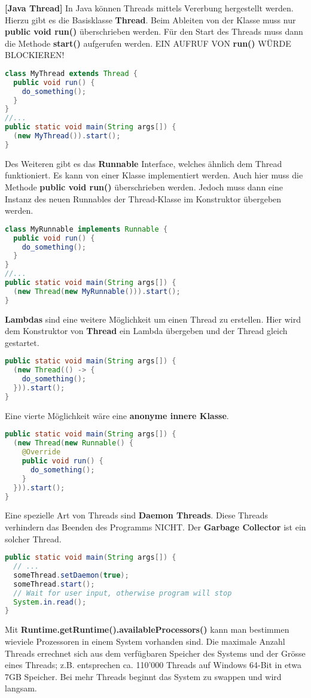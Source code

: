 \documentclass[8pt]{extarticle}
\let\oldtextbf\textbf
\renewcommand{\textbf}{\tiny\oldtextbf}
\begin{document}
\begin{multicols*}{5}
\textbf{[Java Thread]}
In Java können Threads mittels Vererbung hergestellt werden. Hierzu gibt es die Basisklasse \textbf{Thread}. Beim Ableiten von der Klasse muss nur \textbf{public void run()} überschrieben werden. Für den Start des Threads muss dann die Methode \textbf{start()} aufgerufen werden. EIN AUFRUF VON \textbf{run()} WÜRDE BLOCKIEREN!
\begin{lstlisting}[language=java]
class MyThread extends Thread {
  public void run() {
    do_something();
  }
}
//...
public static void main(String args[]) {
  (new MyThread()).start();
}
\end{lstlisting}
Des Weiteren gibt es das \textbf{Runnable} Interface, welches ähnlich dem Thread funktioniert. Es kann von einer Klasse implementiert werden. Auch hier muss die Methode \textbf{public void run()} überschrieben werden. Jedoch muss dann eine Instanz des neuen Runnables der Thread-Klasse im Konstruktor übergeben werden.
\begin{lstlisting}[language=java]
class MyRunnable implements Runnable {
  public void run() {
    do_something();
  }
}
//...
public static void main(String args[]) {
  (new Thread(new MyRunnable())).start();
}
\end{lstlisting}
\textbf{Lambdas} sind eine weitere Möglichkeit um einen Thread zu erstellen. Hier wird dem Konstruktor von \textbf{Thread} ein Lambda übergeben und der Thread gleich gestartet.
\begin{lstlisting}[language=java]
public static void main(String args[]) {
  (new Thread(() -> {
    do_something();
  })).start();
}
\end{lstlisting}
Eine vierte Möglichkeit wäre eine \textbf{anonyme innere Klasse}.
\begin{lstlisting}[language=java]
public static void main(String args[]) {
  (new Thread(new Runnable() {
    @Override
    public void run() {
      do_something();
    }
  })).start();
}
\end{lstlisting}
Eine spezielle Art von Threads sind \textbf{Daemon Threads}. Diese Threads verhindern das Beenden des Programms NICHT. Der \textbf{Garbage Collector} ist ein solcher Thread.
\begin{lstlisting}[language=java]
public static void main(String args[]) {
  // ...
  someThread.setDaemon(true);
  someThread.start();
  // Wait for user input, otherwise program will stop
  System.in.read();
}
\end{lstlisting}
Mit \textbf{Runtime.getRuntime().availableProcessors()} kann man bestimmen wieviele Prozessoren in einem System vorhanden sind. Die maximale Anzahl Threads errechnet sich aus dem verfügbaren Speicher des Systems und der Grösse eines Threads; z.B. entsprechen ca. 110'000 Threads auf Windows 64-Bit in etwa 7GB Speicher. Bei mehr Threads beginnt das System zu swappen und wird langsam.\\\\

\end{multicols*}
\end{document}
